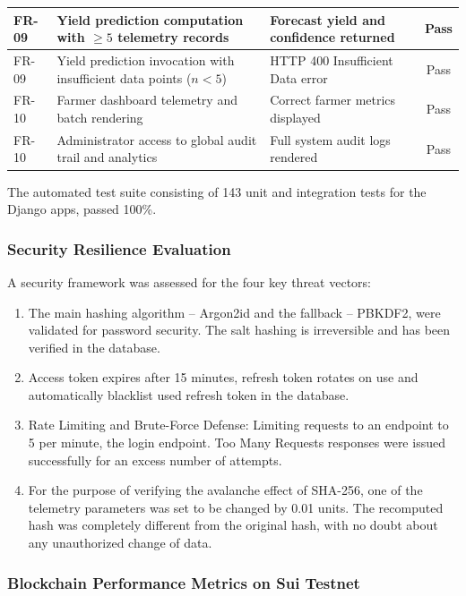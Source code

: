 \begin{table}[H]
\begin{tabularx}{\textwidth}{|l|>{\raggedright\arraybackslash}X|>{\raggedright\arraybackslash}p{4.2cm}|c|}
\hline
FR-09 & Yield prediction computation with $\ge 5$ telemetry records & Forecast yield and confidence returned & Pass \\
\hline
FR-09 & Yield prediction invocation with insufficient data points ($n < 5$) & HTTP 400 Insufficient Data error & Pass \\
\hline
FR-10 & Farmer dashboard telemetry and batch rendering & Correct farmer metrics displayed & Pass \\
\hline
FR-10 & Administrator access to global audit trail and analytics & Full system audit logs rendered & Pass \\
\hline
\end{tabularx}
\end{table}

The automated test suite consisting of 143 unit and integration tests for the Django apps, passed 100\%.

\subsubsection*{Security Resilience Evaluation}

A security framework was assessed for the four key threat vectors:
\begin{enumerate}[label=(\roman*)]
    \item The main hashing algorithm – Argon2id and the fallback – PBKDF2, were validated for password security. The salt hashing is irreversible and has been verified in the database.
    \item Access token expires after 15 minutes, refresh token rotates on use and automatically blacklist used refresh token in the database.
    \item Rate Limiting and Brute-Force Defense: Limiting requests to an endpoint to 5 per minute, the login endpoint. Too Many Requests responses were issued successfully for an excess number of attempts.
    \item For the purpose of verifying the avalanche effect of SHA-256, one of the telemetry parameters was set to be changed by 0.01 units. The recomputed hash was completely different from the original hash, with no doubt about any unauthorized change of data.
\end{enumerate}

\subsubsection*{Blockchain Performance Metrics on Sui Testnet}

